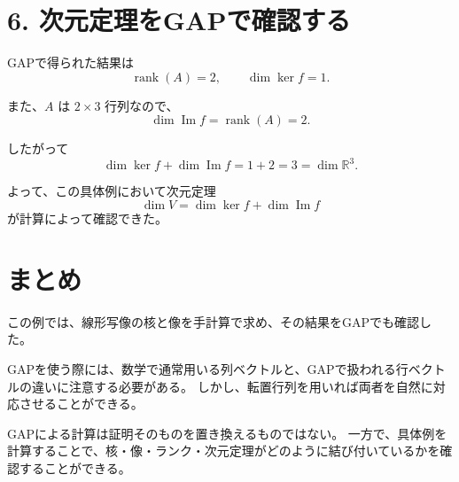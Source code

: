 \documentclass[a4paper,11pt]{ltjsarticle}
\begin{document}
\section*{6. 次元定理をGAPで確認する}

GAPで得られた結果は
\[
\operatorname{rank}(A)=2,
\qquad
\dim\ker f=1.
\]

また、$A$ は $2\times3$ 行列なので、
\[
\dim\operatorname{Im}f
=\operatorname{rank}(A)
=2.
\]

したがって
\[
\dim\ker f+\dim\operatorname{Im}f
=1+2=3
=\dim\mathbb R^3.
\]

よって、この具体例において次元定理
\[
\boxed{
\dim V
=
\dim\ker f+\dim\operatorname{Im}f
}
\]
が計算によって確認できた。

\section*{まとめ}

この例では、線形写像の核と像を手計算で求め、その結果をGAPでも確認した。

GAPを使う際には、数学で通常用いる列ベクトルと、GAPで扱われる行ベクトルの違いに注意する必要がある。
しかし、転置行列を用いれば両者を自然に対応させることができる。

GAPによる計算は証明そのものを置き換えるものではない。
一方で、具体例を計算することで、核・像・ランク・次元定理がどのように結び付いているかを確認することができる。
\end{document}
